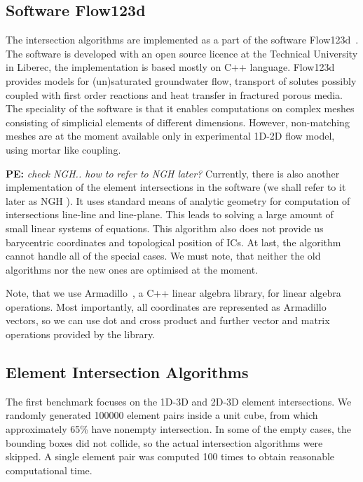 \documentclass{elsarticle}
\newcommand{\notePE}[1]{{\color{Orange} \textbf{PE: } \textit{#1}}}
\newcommand{\ngh}{NGH }
\begin{document}
\subsection{Software Flow123d}
The intersection algorithms are implemented as a part of the software Flow123d~\cite{flow123d}.
The software is developed with an open source licence at the Technical University in Liberec,
the implementation is based mostly on C++ language. 
Flow123d provides models for (un)saturated groundwater flow, transport of solutes possibly
coupled with first order reactions and heat transfer in fractured porous media. 
The speciality of the software is that it enables
computations on complex meshes consisting of simplicial elements of different dimensions. However,
non-matching meshes are at the moment available only in experimental 1D-2D flow model, using mortar like coupling.

\notePE{check NGH.. how to refer to NGH later?}
Currently, there is also another implementation of the element intersections in the software (we shall refer to
it later as \ngh). It uses standard means of analytic geometry for computation of intersections line-line and line-plane.
This leads to solving a large amount of small linear systems of equations.
This algorithm also does not provide us barycentric coordinates and topological position of ICs.
At last, the algorithm cannot handle all of the special cases.
We must note, that neither the old algorithms nor the new ones are optimised at the moment.

Note, that we use Armadillo~\cite{armadillo_2016}, a C++ linear algebra library, for linear algebra operations. Most importantly, all coordinates are represented as Armadillo vectors, so we can use dot and cross product and further vector and matrix operations provided by the library.

\subsection{Element Intersection Algorithms}
The first benchmark focuses on the 1D-3D and 2D-3D element intersections. We randomly generated
100000 element pairs inside a unit cube, from which approximately 65\% have nonempty intersection.
In some of the empty cases, the bounding boxes did not collide, so the actual intersection algorithms were skipped. A single element pair was computed 100 times to obtain reasonable computational time.
\end{document}

